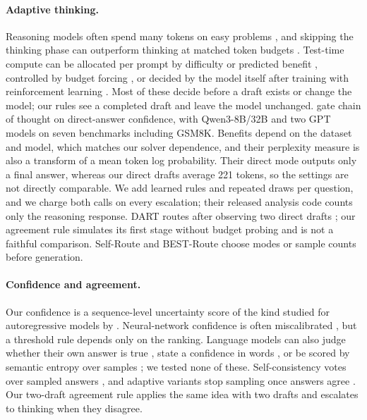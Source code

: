 \documentclass[10pt,letterpaper]{article}
\begin{document}
\paragraph{Adaptive thinking.} Reasoning models often spend many tokens on easy problems \citep{chen2024overthinking,sui2025overthinking}, and skipping the thinking phase can outperform thinking at matched token budgets \citep{ma2025nothinking}. Test-time compute can be allocated per prompt by difficulty or predicted benefit \citep{snell2024testtime,damani2024hardtothink}, controlled by budget forcing \citep{muennighoff2025s1}, or decided by the model itself after training with reinforcement learning \citep{jiang2025lhrm,zhang2025adaptthink,fang2025thinkless}. Most of these decide before a draft exists or change the model; our rules see a completed draft and leave the model unchanged. \citet{lewislim2026confidencegated} gate chain of thought on direct-answer confidence, with Qwen3-8B/32B and two GPT models on seven benchmarks including GSM8K. Benefits depend on the dataset and model, which matches our solver dependence, and their perplexity measure is also a transform of a mean token log probability. Their direct mode outputs only a final answer, whereas our direct drafts average 221 tokens, so the settings are not directly comparable. We add learned rules and repeated draws per question, and we charge both calls on every escalation; their released analysis code counts only the reasoning response. DART routes after observing two direct drafts \citep{lee2026dart}; our agreement rule simulates its first stage without budget probing and is not a faithful comparison. Self-Route \citep{he2025selfroute} and BEST-Route \citep{ding2025bestroute} choose modes or sample counts before generation.

\paragraph{Confidence and agreement.} Our confidence is a sequence-level uncertainty score of the kind studied for autoregressive models by \citet{malinin2021structured}. Neural-network confidence is often miscalibrated \citep{guo2017calibration}, but a threshold rule depends only on the ranking. Language models can also judge whether their own answer is true \citep{kadavath2022know}, state a confidence in words \citep{xiong2024express}, or be scored by semantic entropy over samples \citep{kuhn2023semantic}; we tested none of these. Self-consistency votes over sampled answers \citep{wang2023selfconsistency}, and adaptive variants stop sampling once answers agree \citep{aggarwal2023adaptiveconsistency,li2024esc}. Our two-draft agreement rule applies the same idea with two drafts and escalates to thinking when they disagree.
\end{document}
